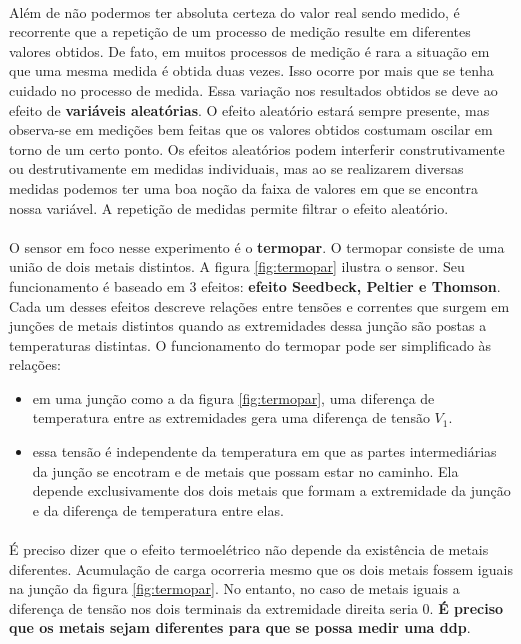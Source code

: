 \documentclass[a4paper,11pt]{article}
\begin{document}
\paragraph{} Além de não podermos ter absoluta certeza do valor real sendo medido,
é recorrente que a repetição de um processo de medição resulte em diferentes valores
obtidos. De fato, em muitos processos de medição é rara a situação em que uma mesma medida
é obtida duas vezes. Isso ocorre por mais que se tenha cuidado no processo de medida.
Essa variação nos resultados obtidos se deve ao efeito de \textbf{variáveis aleatórias}. O efeito
aleatório estará sempre presente, mas observa-se em medições bem feitas que os valores
obtidos costumam oscilar em torno de um certo ponto. Os efeitos aleatórios podem interferir
construtivamente ou destrutivamente em medidas individuais, mas ao se realizarem diversas
medidas podemos ter uma boa noção da faixa de valores em que se encontra nossa variável.
A repetição de medidas permite filtrar o efeito aleatório.

\paragraph{} O sensor em foco nesse experimento é o \textbf{termopar}.
 O termopar consiste de uma
união de dois metais distintos. A figura \ref{fig:termopar} ilustra o sensor. Seu
funcionamento é baseado em 3 efeitos: \textbf{efeito Seedbeck, Peltier e Thomson}. Cada um 
desses efeitos descreve relações entre tensões e correntes que surgem em junções 
de metais distintos quando as extremidades dessa junção são postas a temperaturas 
distintas. O funcionamento do termopar pode ser simplificado às relações:
\begin{itemize}
	\item em uma junção como a da figura \ref{fig:termopar}, uma diferença
	de temperatura entre as extremidades gera uma diferença de tensão $V_1$.
	\item essa tensão é independente da temperatura em que as partes intermediárias
	da junção se encotram e de metais que possam estar no caminho. Ela depende exclusivamente
	dos dois metais que formam a extremidade da junção e da diferença de temperatura entre elas. 	
\end{itemize}
\paragraph{} É preciso dizer que o efeito termoelétrico não depende da existência de 
metais diferentes. Acumulação de carga ocorreria mesmo que os dois metais fossem
iguais na junção da figura \ref{fig:termopar}. No entanto, no caso de metais iguais
a diferença de tensão nos dois terminais da extremidade direita seria 0. \textbf{É preciso que
os metais sejam diferentes para que se possa medir uma ddp}.
\end{document}
